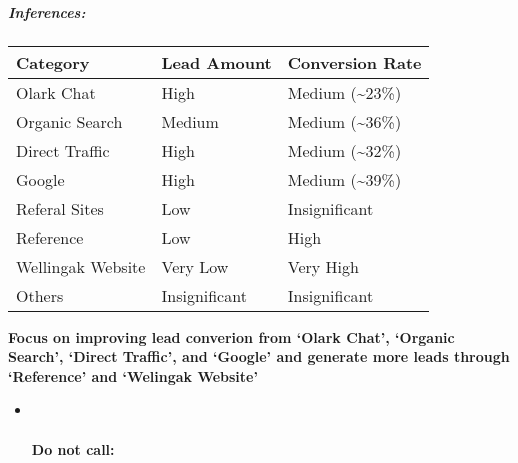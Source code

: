 \documentclass[11pt]{article}
\begin{document}
    \hypertarget{inferences}{%
\subparagraph{Inferences:}\label{inferences}}

\begin{longtable}[]{@{}lll@{}}
\toprule
Category & Lead Amount & Conversion Rate\tabularnewline
\midrule
\endhead
Olark Chat & High & Medium (\textasciitilde{}23\%)\tabularnewline
Organic Search & Medium & Medium (\textasciitilde{}36\%)\tabularnewline
Direct Traffic & High & Medium (\textasciitilde{}32\%)\tabularnewline
Google & High & Medium (\textasciitilde{}39\%)\tabularnewline
Referal Sites & Low & Insignificant\tabularnewline
Reference & Low & High\tabularnewline
Wellingak Website & Very Low & Very High\tabularnewline
Others & Insignificant & Insignificant\tabularnewline
\bottomrule
\end{longtable}

\textbf{Focus on improving lead converion from `Olark Chat', `Organic
Search', `Direct Traffic', and `Google' and generate more leads through
`Reference' and `Welingak Website'}

    \begin{itemize}
\item ~
  \hypertarget{do-not-call}{%
  \paragraph{ Do not call:}\label{do-not-call}}
\end{itemize}
\end{document}
